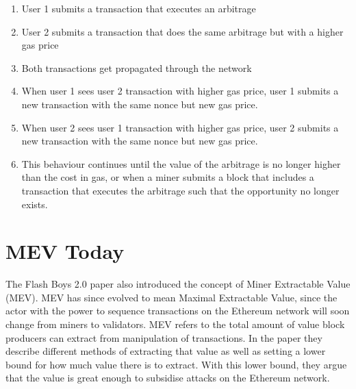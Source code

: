 \begin{enumerate}
    \item User 1 submits a transaction that executes an arbitrage
    \item User 2 submits a transaction that does the same arbitrage but with a higher gas price
    \item Both transactions get propagated through the network
    \item When user 1 sees user 2 transaction with higher gas price, user 1 submits a new transaction with the same nonce but new gas price.
    \item When user 2 sees user 1 transaction with higher gas price, user 2 submits a new transaction with the same nonce but new gas price.
    \item This behaviour continues until the value of the arbitrage is no longer higher than the cost in gas, or when a miner submits a block that includes a transaction that executes the arbitrage such that the opportunity no longer exists.
\end{enumerate}







\section{MEV Today}

The Flash Boys 2.0 paper also introduced the concept of Miner Extractable Value (MEV). MEV has since evolved to mean Maximal Extractable Value, since the actor with the power to sequence transactions on the Ethereum network will soon change from miners to validators. MEV refers to the total amount of value block producers can extract from manipulation of transactions. In the paper they describe different methods of extracting that value as well as setting a lower bound for how much value there is to extract. With this lower bound, they argue that the value is great enough to subsidise attacks on the Ethereum network. 

